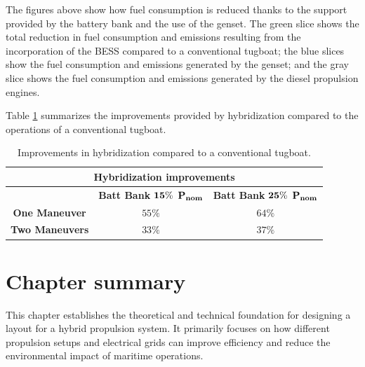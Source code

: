 The figures above show how fuel consumption is reduced thanks to the support provided by the battery bank and the use of the genset. The green slice shows the total reduction in fuel consumption and emissions resulting from the incorporation of the BESS compared to a conventional tugboat; the blue slices show the fuel consumption and emissions generated by the genset; and the gray slice shows the fuel consumption and emissions generated by the diesel propulsion engines.

Table \ref{tab:HybImprovement} summarizes the improvements provided by hybridization compared to the operations of a conventional tugboat.

\begin{table}[H]
	\centering
	\caption{Improvements in hybridization compared to a conventional tugboat.}
	\label{tab:HybImprovement}
	\begin{tabular}{|c|c|c|}
		\hline
		\multicolumn{3}{|c|}{\textbf{Hybridization improvements}} \\
		\hline\hline
		 & \textbf{Batt Bank} $\bf 15\%$ $\text{\textbf{P}}_{\text{\textbf{nom}}}$ &  \textbf{Batt Bank} $\bf 25\%$ $\text{\textbf{P}}_{\text{\textbf{nom}}}$  \\	
		\hline
		\textbf{One Maneuver} & $55\%$ & $64\%$   \\
		\hline  
		\textbf{Two Maneuvers} & $33\%$ & $37\%$  \\		
		\hline		
	\end{tabular}
\end{table}

\section{Chapter summary}
This chapter establishes the theoretical and technical foundation for designing a layout for a hybrid propulsion system. It primarily focuses on how different propulsion setups and electrical grids can improve efficiency and reduce the environmental impact of maritime operations.

